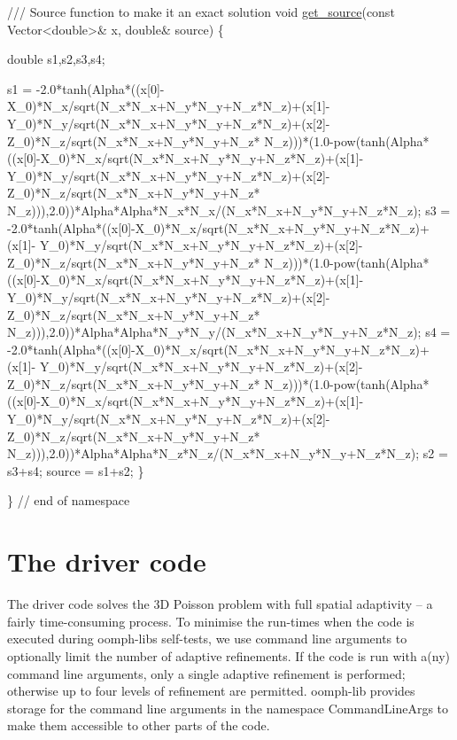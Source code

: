 \begin{DoxyCodeInclude}
\textcolor{comment}{}
\textcolor{comment}{ /// Source function to make it an exact solution }
\textcolor{comment}{} \textcolor{keywordtype}{void} \hyperlink{namespaceTanhSolnForPoisson_ae1b9d6789ff301e3d63a4e292213036c}{get\_source}(\textcolor{keyword}{const} Vector<double>& x, \textcolor{keywordtype}{double}& source)
 \{

  \textcolor{keywordtype}{double} s1,s2,s3,s4;

  s1 = -2.0*tanh(Alpha*((x[0]-X\_0)*N\_x/sqrt(N\_x*N\_x+N\_y*N\_y+N\_z*N\_z)+(x[1]-
Y\_0)*N\_y/sqrt(N\_x*N\_x+N\_y*N\_y+N\_z*N\_z)+(x[2]-Z\_0)*N\_z/sqrt(N\_x*N\_x+N\_y*N\_y+N\_z*
N\_z)))*(1.0-pow(tanh(Alpha*((x[0]-X\_0)*N\_x/sqrt(N\_x*N\_x+N\_y*N\_y+N\_z*N\_z)+(x[1]-
Y\_0)*N\_y/sqrt(N\_x*N\_x+N\_y*N\_y+N\_z*N\_z)+(x[2]-Z\_0)*N\_z/sqrt(N\_x*N\_x+N\_y*N\_y+N\_z*
N\_z))),2.0))*Alpha*Alpha*N\_x*N\_x/(N\_x*N\_x+N\_y*N\_y+N\_z*N\_z);
      s3 = -2.0*tanh(Alpha*((x[0]-X\_0)*N\_x/sqrt(N\_x*N\_x+N\_y*N\_y+N\_z*N\_z)+(x[1]-
Y\_0)*N\_y/sqrt(N\_x*N\_x+N\_y*N\_y+N\_z*N\_z)+(x[2]-Z\_0)*N\_z/sqrt(N\_x*N\_x+N\_y*N\_y+N\_z*
N\_z)))*(1.0-pow(tanh(Alpha*((x[0]-X\_0)*N\_x/sqrt(N\_x*N\_x+N\_y*N\_y+N\_z*N\_z)+(x[1]-
Y\_0)*N\_y/sqrt(N\_x*N\_x+N\_y*N\_y+N\_z*N\_z)+(x[2]-Z\_0)*N\_z/sqrt(N\_x*N\_x+N\_y*N\_y+N\_z*
N\_z))),2.0))*Alpha*Alpha*N\_y*N\_y/(N\_x*N\_x+N\_y*N\_y+N\_z*N\_z);
      s4 = -2.0*tanh(Alpha*((x[0]-X\_0)*N\_x/sqrt(N\_x*N\_x+N\_y*N\_y+N\_z*N\_z)+(x[1]-
Y\_0)*N\_y/sqrt(N\_x*N\_x+N\_y*N\_y+N\_z*N\_z)+(x[2]-Z\_0)*N\_z/sqrt(N\_x*N\_x+N\_y*N\_y+N\_z*
N\_z)))*(1.0-pow(tanh(Alpha*((x[0]-X\_0)*N\_x/sqrt(N\_x*N\_x+N\_y*N\_y+N\_z*N\_z)+(x[1]-
Y\_0)*N\_y/sqrt(N\_x*N\_x+N\_y*N\_y+N\_z*N\_z)+(x[2]-Z\_0)*N\_z/sqrt(N\_x*N\_x+N\_y*N\_y+N\_z*
N\_z))),2.0))*Alpha*Alpha*N\_z*N\_z/(N\_x*N\_x+N\_y*N\_y+N\_z*N\_z);
      s2 = s3+s4;
      source = s1+s2;
 \}


\} \textcolor{comment}{// end of namespace}

\end{DoxyCodeInclude}




 

\hypertarget{index_main}{}\section{The driver code}\label{index_main}
The driver code solves the 3D Poisson problem with full spatial adaptivity -- a fairly time-\/consuming process. To minimise the run-\/times when the code is executed during {\ttfamily oomph-\/lib\textquotesingle{}s} self-\/tests, we use command line arguments to optionally limit the number of adaptive refinements. If the code is run with a(ny) command line arguments, only a single adaptive refinement is performed; otherwise up to four levels of refinement are permitted. {\ttfamily oomph-\/lib} provides storage for the command line arguments in the namespace {\ttfamily Command\+Line\+Args} to make them accessible to other parts of the code.

